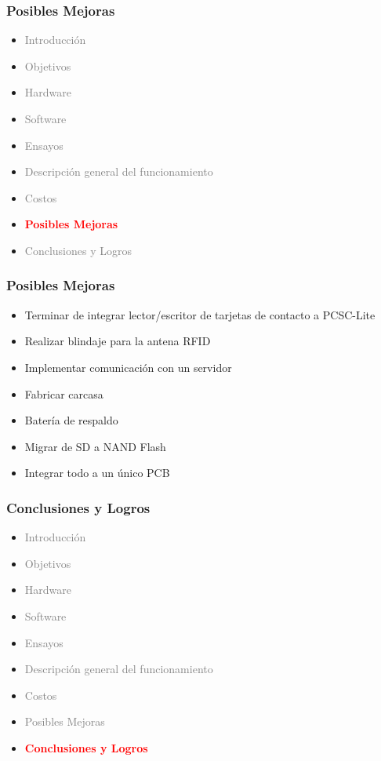 \documentclass{beamer}
\begin{document}
\begin{frame}
	\frametitle{Posibles Mejoras}
	\begin{itemize}
		\item \textcolor{gray}{Introducción}
		\item \textcolor{gray}{Objetivos}
		\item \textcolor{gray}{Hardware}
		\item \textcolor{gray}{Software}
		\item \textcolor{gray}{Ensayos}
		\item \textcolor{gray}{Descripción general del funcionamiento}		
		\item \textcolor{gray}{Costos}
		\item \textcolor{red}{\bf{Posibles Mejoras}}
		\item \textcolor{gray}{Conclusiones y Logros}
	\end{itemize}
\end{frame}

\begin{frame}
	\frametitle{Posibles Mejoras}
	\begin{itemize}
		\item <2-> Terminar de integrar lector/escritor de tarjetas de contacto a PCSC-Lite

		\bigskip		
		\item <3-> Realizar blindaje para la antena RFID
		
		\bigskip		
		\item <4-> Implementar comunicación con un servidor
				
		\bigskip		
		\item <5-> Fabricar carcasa
		
		\bigskip		
		\item <6-> Batería de respaldo
		
		\bigskip		
		\item <7-> Migrar de SD a NAND Flash

		\bigskip		
		\item <8-> Integrar todo a un único PCB
	\end{itemize}
\end{frame}	

\begin{frame}
	\frametitle{Conclusiones y Logros}
	\begin{itemize}
		\item \textcolor{gray}{Introducción}
		\item \textcolor{gray}{Objetivos}
		\item \textcolor{gray}{Hardware}
		\item \textcolor{gray}{Software}
		\item \textcolor{gray}{Ensayos}
		\item \textcolor{gray}{Descripción general del funcionamiento}		
		\item \textcolor{gray}{Costos}
		\item \textcolor{gray}{Posibles Mejoras}
		\item \textcolor{red}{\bf{Conclusiones y Logros}}
	\end{itemize}
\end{frame}
\end{document}
